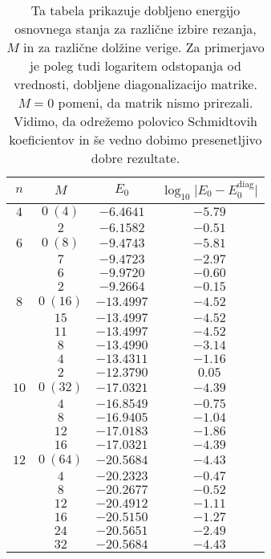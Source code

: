 \documentclass[12pt, a4 paper]{article}
\begin{document}
\begin{table}[H]\centering
	\caption{Ta tabela prikazuje dobljeno energijo osnovnega stanja za razli\v cne izbire rezanja, $M$
		in za razli\v cne dol\v zine verige. Za primerjavo je poleg tudi logaritem odstopanja od vrednosti,
		dobljene diagonalizacijo matrike. $M = 0$ pomeni, da matrik nismo prirezali. Vidimo, da odre\v zemo
		polovico Schmidtovih koeficientov in \v se vedno dobimo presenetljivo dobre rezultate.}
	\vspace{6pt}
	\begin{tabular}{c|c|c|c}
		$n$ & $M$ & $E_0$ & $\log_{10}\big|E_0 - E_0^\text{diag}\big|$ \\
		\hline
		$4$ & $0\ (4)$ & $-6.4641$ & $-5.79$ \\
		    & $2$ & $-6.1582$ & $-0.51$ \\
		\hline
		$6$ & $0\ (8)$ & $-9.4743$ & $-5.81$ \\
		    & $7$ & $-9.4723$ & $-2.97$ \\
		    & $6$ & $-9.9720$ & $-0.60$ \\
		    & $2$ & $-9.2664$ & $-0.15$ \\
		\hline
		$8$ & $0\ (16)$ & $-13.4997$ & $-4.52$ \\
		    & $15$ & $-13.4997$ & $-4.52$ \\
		    & $11$ & $-13.4997$ & $-4.52$ \\ 
		    & $8$ & $-13.4990$ & $-3.14$ \\
		    & $4$ & $-13.4311$ & $-1.16$ \\
		    & $2$ & $-12.3790$ & $0.05$ \\
		\hline
		$10$ & $0\ (32)$ & $-17.0321$ & $-4.39$ \\
		     & $4$ & $-16.8549$ & $-0.75$ \\
		     & $8$ & $-16.9405$ & $-1.04$ \\
		     & $12$ & $-17.0183$ & $-1.86$ \\
		     & $16$ & $-17.0321$ & $-4.39$ \\
		\hline
		$12$ & $0\ (64)$ & $-20.5684$ & $-4.43$ \\
		     & $4$ & $-20.2323$ & $-0.47$ \\
		     & $8$ & $-20.2677$ & $-0.52$ \\
		     & $12$ & $-20.4912$ & $-1.11$ \\
		     & $16$ & $-20.5150$ & $-1.27$ \\
		     & $24$ & $-20.5651$ & $-2.49$ \\
		     & $32$ & $-20.5684$ & $-4.43$
	\end{tabular}
	\label{tab1}
\end{table}
\end{document}
